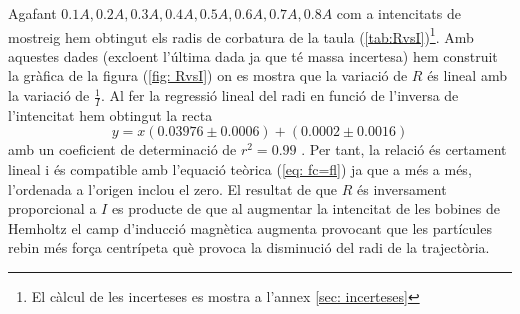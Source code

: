 \documentclass[11pt]{article}
\begin{document}
Agafant $0.1A, 0.2A, 0.3A, 0.4A, 0.5A, 0.6A, 0.7A, 0.8A$ com a intencitats de mostreig hem obtingut els radis de corbatura de la taula (\ref{tab:RvsI})\footnote{El càlcul de les incerteses es mostra a l'annex \ref{sec: incerteses}}. Amb aquestes dades (excloent l'última dada ja que té massa incertesa) hem construit la gràfica de la figura (\ref{fig: RvsI}) on es mostra que la variació de $R$ és lineal amb la variació de $\frac{1}{I}$. 
Al fer la regressió lineal del radi en funció de l'inversa de l'intencitat hem obtingut la recta
\begin{equation}
    y=x(0.03976\pm0.0006)+(0.0002\pm0.0016)
\end{equation}  
amb un coeficient de determinació de $r^2=0.99$ . Per tant, la relació és certament lineal i és compatible amb l'equació teòrica (\ref{eq: fc=fl}) ja que a més a més, l'ordenada a l'origen inclou el zero. El resultat de que $R$ és inversament proporcional a $I$ es producte de que al augmentar la intencitat de les bobines de Hemholtz el camp d'inducció magnètica augmenta provocant que les partícules rebin més força centrípeta què provoca la disminució del radi de la trajectòria.

 
\end{document}
